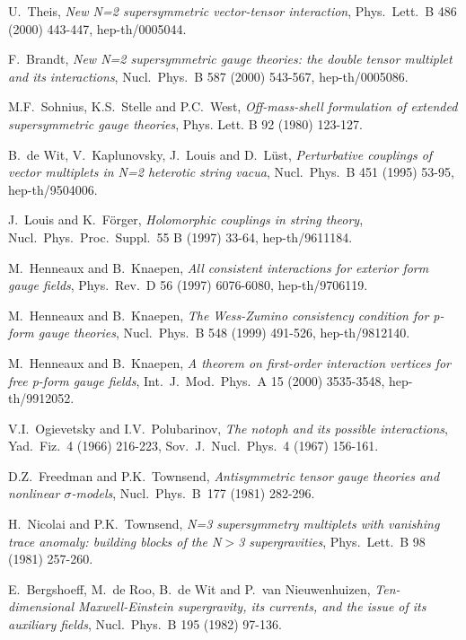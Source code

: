 \documentclass[a4paper,12pt]{article}
\begin{document}
\begin{thebibliography}{30}
U.\ Theis,
{\it New N=2 supersymmetric vector-tensor interaction},
Phys.\ Lett.\ B 486 (2000) 443-447, 
hep-th/0005044.

F.\ Brandt, 
{\it New N=2 supersymmetric gauge theories: 
the double tensor multiplet and its interactions},
Nucl.\ Phys.\ B 587 (2000) 543-567,
hep-th/0005086.

M.F.\ Sohnius, K.S.\ Stelle and P.C.\ West, 
{\it Off-mass-shell formulation of extended supersymmetric
gauge theories},
Phys. Lett. B 92 (1980) 123-127.

B.\ de Wit, V.\ Kaplunovsky, J.\ Louis and D.\ L\"ust,
{\it Perturbative couplings of vector multiplets in 
N=2 heterotic string vacua}, 
Nucl.\ Phys.\ B 451 (1995) 53-95, 
hep-th/9504006.

J.\ Louis and K.\ F\"orger,
{\it Holomorphic couplings in string theory},
Nucl.\ Phys.\ Proc.\ Suppl.\ 55 B (1997) 33-64,
hep-th/9611184.

M.\ Henneaux and B.\ Knaepen,
{\it All consistent interactions for exterior form gauge fields},
Phys.\ Rev.\ D 56 (1997) 6076-6080,
hep-th/9706119.

M.\ Henneaux and B.\ Knaepen,
{\it The Wess-Zumino consistency condition for p-form gauge theories},
Nucl.\ Phys.\ B 548 (1999) 491-526,
hep-th/9812140.

M.\ Henneaux and B.\ Knaepen,
{\it A theorem on first-order interaction vertices 
for free p-form gauge fields},
Int.\ J.\ Mod.\ Phys.\ A 15 (2000) 3535-3548,
hep-th/9912052.

V.I.\ Ogievetsky and I.V.\ Polubarinov, 
{\it The notoph and its possible interactions},
Yad.\ Fiz.\ 4 (1966) 216-223, 
Sov.\ J.\ Nucl.\ Phys.\ 4 (1967) 156-161.

D.Z.\ Freedman and P.K.\ Townsend, 
{\it Antisymmetric tensor gauge theories and nonlinear $\sigma$-models},
Nucl.\ Phys.\ B\ 177 (1981) 282-296.

H.\ Nicolai and P.K.\ Townsend,
{\it N=3 supersymmetry multiplets with vanishing trace anomaly:
building blocks of the N$>$3 supergravities},
Phys.\ Lett.\ B 98 (1981) 257-260.

E.\ Bergshoeff, M.\ de Roo, B.\ de Wit and P.\ van Nieuwenhuizen,
{\it Ten-dimensional Maxwell-Einstein supergravity, its currents,
and the issue of its auxiliary fields}, 
Nucl.\ Phys.\ B 195 (1982) 97-136.
  

\end{thebibliography}
\end{document}
